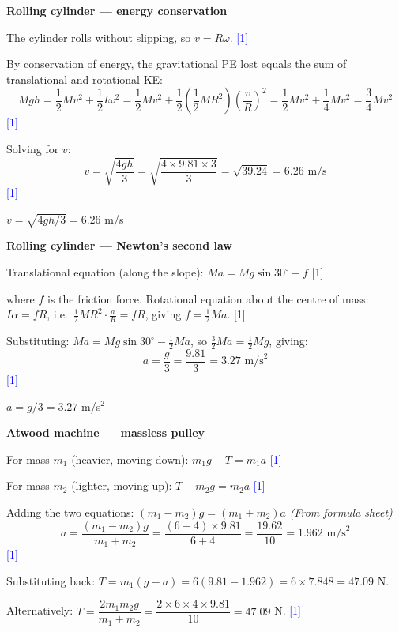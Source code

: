 \documentclass[12pt,a4paper]{article}
\newcommand{\markstep}[1]{\hfill\textcolor{blue}{[#1]}}
\newcommand{\finalanswer}[1]{%
  \begin{tcolorbox}[colback=green!5!white,colframe=green!50!black,boxrule=0.5pt]
  #1
  \end{tcolorbox}
}
\newcommand{\fromsheet}{\textit{(From formula sheet)}}
\begin{document}
\begin{parts}
\item \textbf{Rolling cylinder --- energy conservation} 

The cylinder rolls without slipping, so $v = R\omega$. \markstep{1}

By conservation of energy, the gravitational PE lost equals the sum of translational and rotational KE:
\[
Mgh = \frac{1}{2}Mv^2 + \frac{1}{2}I\omega^2 = \frac{1}{2}Mv^2 + \frac{1}{2}\left(\frac{1}{2}MR^2\right)\left(\frac{v}{R}\right)^2 = \frac{1}{2}Mv^2 + \frac{1}{4}Mv^2 = \frac{3}{4}Mv^2
\]
\markstep{1}

Solving for $v$:
\[
v = \sqrt{\frac{4gh}{3}} = \sqrt{\frac{4 \times 9.81 \times 3}{3}} = \sqrt{39.24} = 6.26 \text{ m/s}
\]
\markstep{1}

\finalanswer{$v = \sqrt{4gh/3} = 6.26$ m/s}

\item \textbf{Rolling cylinder --- Newton's second law} 

Translational equation (along the slope): $Ma = Mg\sin 30^\circ - f$ \markstep{1}

where $f$ is the friction force. Rotational equation about the centre of mass: $I\alpha = fR$, i.e.\ $\frac{1}{2}MR^2 \cdot \frac{a}{R} = fR$, giving $f = \frac{1}{2}Ma$. \markstep{1}

Substituting: $Ma = Mg\sin 30^\circ - \frac{1}{2}Ma$, so $\frac{3}{2}Ma = \frac{1}{2}Mg$, giving:
\[
a = \frac{g}{3} = \frac{9.81}{3} = 3.27 \text{ m/s}^2
\]
\markstep{1}

\finalanswer{$a = g/3 = 3.27$ m/s$^2$}

\item \textbf{Atwood machine --- massless pulley} 

For mass $m_1$ (heavier, moving down): $m_1 g - T = m_1 a$ \markstep{1}

For mass $m_2$ (lighter, moving up): $T - m_2 g = m_2 a$ \markstep{1}

Adding the two equations: $(m_1 - m_2)g = (m_1 + m_2)a$ \fromsheet
\[
a = \frac{(m_1 - m_2)g}{m_1 + m_2} = \frac{(6 - 4) \times 9.81}{6 + 4} = \frac{19.62}{10} = 1.962 \text{ m/s}^2
\]
\markstep{1}

Substituting back: $T = m_1(g - a) = 6(9.81 - 1.962) = 6 \times 7.848 = 47.09$ N.

Alternatively: $T = \dfrac{2m_1 m_2 g}{m_1 + m_2} = \dfrac{2 \times 6 \times 4 \times 9.81}{10} = 47.09$ N. \markstep{1}


\end{parts}
\end{document}
